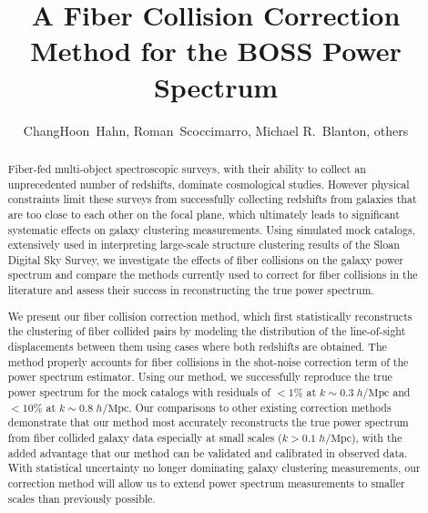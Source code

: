 \documentclass{emulateapj}
\begin{document}
\title{A Fiber Collision Correction Method for the BOSS Power Spectrum} 

\author{ChangHoon~Hahn, 
Roman~Scoccimarro, 
Michael R.~Blanton, others} 

\begin{abstract}
Fiber-fed multi-object spectroscopic surveys, with their ability to collect an unprecedented number of redshifts, dominate cosmological studies. However physical constraints limit these surveys from successfully collecting redshifts from galaxies that are too close to each other on the focal plane, which ultimately leads to significant systematic effects on galaxy clustering measurements. Using simulated mock catalogs, extensively used in interpreting large-scale structure clustering results of the Sloan Digital Sky Survey, we investigate the effects of fiber collisions on the galaxy power spectrum and compare the methods currently used to correct for fiber collisions in the literature and assess their success in reconstructing the true power spectrum. 

We present our fiber collision correction method, which first statistically reconstructs the clustering of fiber collided pairs by modeling the distribution of the line-of-sight displacements between them using cases where both redshifts are obtained. The method properly accounts for fiber collisions in the shot-noise correction term of the power spectrum estimator. Using our method, we successfully reproduce the true power spectrum for the mock catalogs with residuals of $< 1\%$ at $k \sim 0.3 \; h/\mathrm{Mpc}$ and $< 10\%$ at $k \sim 0.8 \; h/\mathrm{Mpc}$. Our comparisons to other existing correction methods demonstrate that our method most accurately reconstructs the true power spectrum from fiber collided galaxy data especially at small scales ($k > 0.1\; h/\mathrm{Mpc}$), with the added advantage that our method can be validated and calibrated in observed data. With statistical uncertainty no longer dominating galaxy clustering measurements, our correction method will allow us to extend power spectrum measurements to smaller scales than previously possible. 
\end{abstract}
\end{document}
